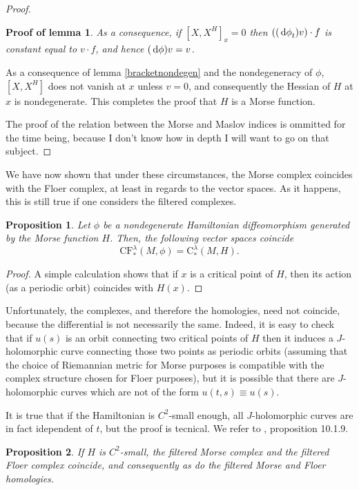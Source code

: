 \documentclass{article}
\newtheorem{prop}{Proposition}
\theoremstyle{nonumberplain}
\newtheorem{proof}{Proof}
\newtheorem{lemmaproof}{Proof of lemma}
\newcommand{\CF}{\mathrm{CF}}
\newcommand{\MC}{\mathrm{C}}
\begin{document}
\begin{proof}
\begin{lemmaproof}
As a consequence, if $[X,X^H]_x = 0$ then $((\dl \phi_t)v) \cdot f$ is constant equal to $v \cdot f$, and hence $(\dl \phi) v = v$.
\end{lemmaproof}

As a consequence of lemma \ref{bracketnondegen} and the nondegeneracy of $\phi$, $[X,X^H]$ does not vanish at $x$ unless $v = 0$, and consequently the Hessian of $H$ at $x$ is nondegenerate. This completes the proof that $H$ is a Morse function.

The proof of the relation between the Morse and Maslov indices is ommitted for the time being, because I don't know how in depth I will want to go on that subject.
\end{proof}

We have now shown that under these circumstances, the Morse complex coincides with the Floer complex, at least in regards to the vector spaces. As it happens, this is still true if one considers the filtered complexes.

\begin{prop}
Let $\phi$ be a nondegenerate Hamiltonian diffeomorphism generated by the Morse function $H$. Then, the following vector spaces coincide
\begin{equation}
\CF^\lambda_*(M,\phi) = \MC^\lambda_*(M,H).
\end{equation}
\end{prop}

\begin{proof}
A simple calculation shows that if $x$ is a critical point of $H$, then its action (as a periodic orbit) coincides with $H(x)$.
\end{proof}

Unfortunately, the complexes, and therefore the homologies, need not coincide, because the differential is not necessarily the same. Indeed, it is easy to check that if $u(s)$ is an orbit connecting two critical points of $H$ then it induces a $J$-holomorphic curve connecting those two points as periodic orbits (assuming that the choice of Riemannian metric for Morse purposes is compatible with the complex structure chosen for Floer purposes), but it is possible that there are $J$-holomorphic curves which are not of the form $u(t,s) \equiv u(s)$.

It is true that if the Hamiltonian is $C^2$-small enough, all $J$-holomorphic curves are in fact idependent of $t$, but the proof is tecnical. We refer to \cite{audin}, proposition 10.1.9.

\begin{prop}
If $H$ is $C^2$-small, the filtered Morse complex and the filtered Floer complex coincide, and consequently as do the filtered Morse and Floer homologies.
\end{prop}
\end{document}
